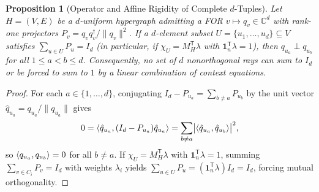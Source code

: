 \documentclass[aps,pra,reprint,superscriptaddress,longbibliography,nofootinbib,floatfix,10pt]{revtex4-2}
\newtheorem{proposition}[theorem]{Proposition}
\theoremstyle{definition}\newtheorem{definition}[theorem]{Definition}
\theoremstyle{remark}\newtheorem{remark}[theorem]{Remark}
\newcommand{\C}{\mathbb C}\newcommand{\R}{\mathbb R}\newcommand{\Q}{\mathbb Q}
\begin{document}
\begin{proposition}[Operator and Affine Rigidity of Complete $d$-Tuples]\label{prop:no-operator-complete}
Let $H=(V,E)$ be a $d$-uniform hypergraph admitting a FOR $v\mapsto q_v\in\C^d$ with rank-one projectors $P_v=q_vq_v^\dagger/\|q_v\|^2$. If a $d$-element subset $U=\{u_1,\ldots,u_d\}\subseteq V$ satisfies $\sum_{u\in U}P_u=I_d$ (in particular, if $\chi_U=M_H^{\mathsf T}\lambda$ with $\mathbf{1}_n^{\mathsf T}\lambda=1$), then $q_{u_a}\perp q_{u_b}$ for all $1\le a<b\le d$. Consequently, no set of $d$ nonorthogonal rays can sum to $I_d$ or be forced to sum to $1$ by a linear combination of context equations.
\end{proposition}
\begin{proof}
For each $a\in\{1,\ldots,d\}$, conjugating $I_d-P_{u_a}=\sum_{b\neq a}P_{u_b}$ by the unit vector $\hat{q}_{u_a}=q_{u_a}/\|q_{u_a}\|$ gives
\[
0 = \langle \hat{q}_{u_a},(I_d-P_{u_a})\hat{q}_{u_a}\rangle = \sum_{b\neq a}\bigl|\langle \hat{q}_{u_a},\hat{q}_{u_b}\rangle\bigr|^2,
\]
so $\langle q_{u_a},q_{u_b}\rangle=0$ for all $b\neq a$. If $\chi_U=M_H^{\mathsf T}\lambda$ with $\mathbf{1}_n^{\mathsf T}\lambda=1$, summing $\sum_{v\in C_i}P_v=I_d$ with weights $\lambda_i$ yields $\sum_{u\in U}P_u=(\mathbf{1}_n^{\mathsf T}\lambda)I_d=I_d$, forcing mutual orthogonality.
\end{proof}
\end{document}
